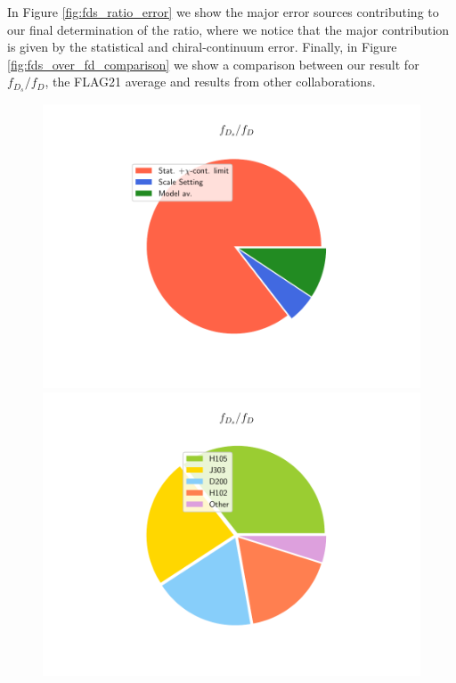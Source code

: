   In Figure \ref{fig:fds_ratio_error}  we show the major error sources contributing to our final determination of the ratio, where we notice that the major contribution is given by the statistical and chiral-continuum error. Finally, in Figure \ref{fig:fds_over_fd_comparison} we show a comparison between our result for $f_{D_s}/f_D$, the FLAG21 average and results from other collaborations.


\begin{figure}
\begin{center}
\begin{minipage}{.4\linewidth}
\includegraphics[width=\linewidth]{././cap6/figs/fds/error_pie_ratio_fds.pdf}
\end{minipage}
\hspace{15mm}
\begin{minipage}{.37\linewidth}
\includegraphics[width=\linewidth]{././cap6/figs/fds/error_pie_ratio_fds_statonly.pdf}

\end{minipage}
\end{center}
\end{figure}
